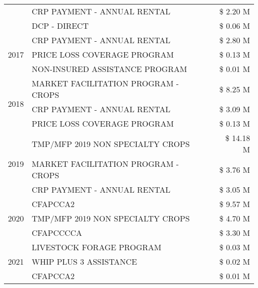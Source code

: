 \begin{tabular}{llr}
 & CRP PAYMENT - ANNUAL RENTAL & \$ 2.20 M \\
 & DCP - DIRECT & \$ 0.06 M \\
\cline{1-3}
\multirow[t]{3}{*}{2017} & CRP PAYMENT - ANNUAL RENTAL & \$ 2.80 M \\
 & PRICE LOSS COVERAGE PROGRAM & \$ 0.13 M \\
 & NON-INSURED ASSISTANCE PROGRAM & \$ 0.01 M \\
\cline{1-3}
\multirow[t]{3}{*}{2018} & MARKET FACILITATION PROGRAM - CROPS & \$ 8.25 M \\
 & CRP PAYMENT - ANNUAL RENTAL & \$ 3.09 M \\
 & PRICE LOSS COVERAGE PROGRAM & \$ 0.13 M \\
\cline{1-3}
\multirow[t]{3}{*}{2019} & TMP/MFP 2019 NON SPECIALTY CROPS & \$ 14.18 M \\
 & MARKET FACILITATION PROGRAM - CROPS & \$ 3.76 M \\
 & CRP PAYMENT - ANNUAL RENTAL & \$ 3.05 M \\
\cline{1-3}
\multirow[t]{3}{*}{2020} & CFAPCCA2 & \$ 9.57 M \\
 & TMP/MFP 2019 NON SPECIALTY CROPS & \$ 4.70 M \\
 & CFAPCCCCA & \$ 3.30 M \\
\cline{1-3}
\multirow[t]{3}{*}{2021} & LIVESTOCK FORAGE PROGRAM & \$ 0.03 M \\
 & WHIP PLUS 3 ASSISTANCE & \$ 0.02 M \\
 & CFAPCCA2 & \$ 0.01 M \\
\cline{1-3}
\bottomrule
\end{tabular}
